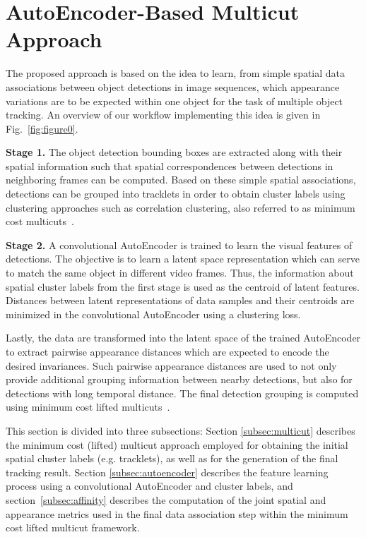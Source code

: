 \section{AutoEncoder-Based Multicut Approach}
\label{subsec:method}
The proposed approach is based on the idea to learn, from simple spatial data associations between object detections in image sequences, which appearance variations are to be expected within one object for the task of multiple object tracking. An overview of our workflow implementing this idea is given in Fig.~\ref{fig:figure0}.

\textbf{Stage 1.} 
The object detection bounding boxes are extracted along with their spatial information such that spatial correspondences between detections in neighboring frames can be computed.
Based on these simple spatial associations, detections can be grouped into tracklets in order to obtain cluster labels using clustering approaches such as correlation clustering, also referred to as minimum cost multicuts~\cite{demaine-2006}.

\textbf{Stage 2.} 
A convolutional AutoEncoder is trained to learn the visual features of detections. 
The objective is to learn a latent space representation which can serve to match the same object in different video frames. 
Thus, the information about spatial cluster labels from the first stage is used as the centroid of latent features. 
Distances between latent representations of data samples and their centroids are minimized in the convolutional AutoEncoder using a clustering loss. 

Lastly, the data are transformed into the latent space of the trained AutoEncoder to extract pairwise appearance distances which are expected to encode the desired invariances. 
Such pairwise appearance distances are used to not only provide additional grouping information between nearby detections, but also for detections with long temporal distance. 
The final detection grouping is computed using minimum cost lifted multicuts~\cite{keupericcv}.

This section is divided into three subsections: 
Section \ref{subsec:multicut} describes the minimum cost (lifted) multicut approach employed for obtaining the initial spatial cluster labels (e.g. tracklets), as well as for the generation of the final tracking result. Section \ref{subsec:autoencoder} describes the feature learning process using a convolutional AutoEncoder and cluster labels, and section~\ref{subsec:affinity} describes the computation of the joint spatial and appearance metrics used in the final data association step within the minimum cost lifted multicut framework.

